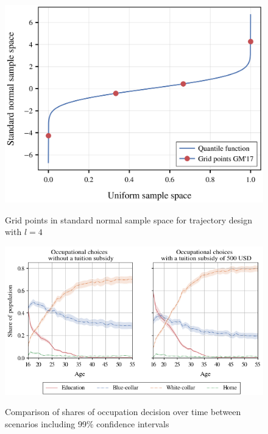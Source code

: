 \begin{figure}[H]
	\caption{Grid points in standard normal sample space for trajectory design with $l=4$}
	\centering
	\includegraphics[scale=0.40]{../scrypy/figures/quantile_fct}
	\label{fig:invcdf}
\end{figure}



\begin{figure}[H]
	\caption{Comparison of shares of occupation decision over time between scenarios including 99$\%$ confidence intervals}
	\centering
	\includegraphics[scale=0.75]{../scrypy/figures/cone_plot_choice_shares}
	\label{fig:uq_paths}
\end{figure}

\vspace{10mm} %

